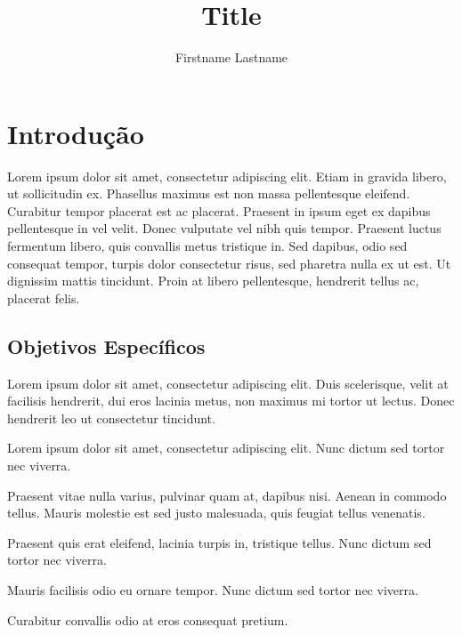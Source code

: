 \documentclass{uecetex2}
\title{Title}
\author{Firstname Lastname}
\begin{document}
\chapter{Introdução}
\label{cap:introducao}

Lorem ipsum dolor sit amet, consectetur adipiscing elit. Etiam in gravida libero, ut sollicitudin ex. Phasellus maximus est non massa pellentesque eleifend. Curabitur tempor placerat est ac placerat. Praesent in ipsum eget ex dapibus pellentesque in vel velit. Donec vulputate vel nibh quis tempor. Praesent luctus fermentum libero, quis convallis metus tristique in. Sed dapibus, odio sed consequat tempor, turpis dolor consectetur risus, sed pharetra nulla ex ut est. Ut dignissim mattis tincidunt. Proin at libero pellentesque, hendrerit tellus ac, placerat felis.

\section{Objetivos Específicos}
\label{sec:objetivos-especificos}

Lorem ipsum dolor sit amet, consectetur adipiscing elit. Duis scelerisque, velit at facilisis hendrerit, dui eros lacinia metus, non maximus mi tortor ut lectus. Donec hendrerit leo ut consectetur tincidunt.

	\begin{alineas}
		\item Lorem ipsum dolor sit amet, consectetur adipiscing elit. Nunc dictum sed tortor nec viverra.
		\item Praesent vitae nulla varius, pulvinar quam at, dapibus nisi. Aenean in commodo tellus. Mauris molestie est sed justo malesuada, quis feugiat tellus venenatis.
		\item Praesent quis erat eleifend, lacinia turpis in, tristique tellus. Nunc dictum sed tortor nec viverra.
		\item Mauris facilisis odio eu ornare tempor. Nunc dictum sed tortor nec viverra.
		\item Curabitur convallis odio at eros consequat pretium.
	\end{alineas}
\end{document}
